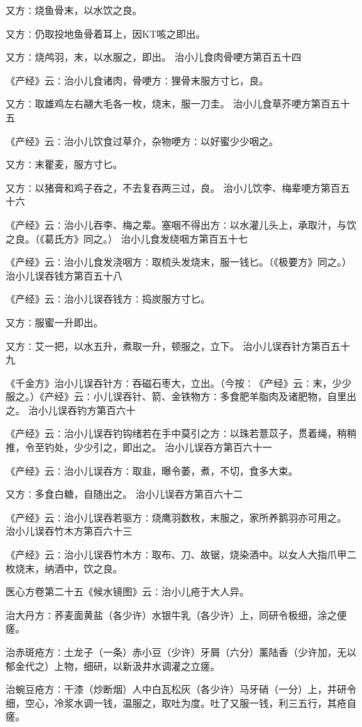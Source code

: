 \documentclass[a4paper,12pt,UTF8,twoside]{ctexbook}
\begin{document}
又方∶烧鱼骨末，以水饮之良。

又方∶仍取投地鱼骨着耳上，因KT咳之即出。

又方∶烧鸬羽，末，以水服之，即出。
治小儿食肉骨哽方第百五十四

《产经》云∶治小儿食诸肉，骨哽方∶狸骨末服方寸匕，良。

又方∶取雄鸡左右翮大毛各一枚，烧末，服一刀圭。
治小儿食草芥哽方第百五十五

《产经》云∶治小儿饮食过草介，杂物哽方∶以好蜜少少咽之。

又方∶末瞿麦，服方寸匕。

又方∶以猪膏和鸡子吞之，不去复吞两三过，良。
治小儿饮李、梅辈哽方第百五十六

《产经》云∶治小儿吞李、梅之辈。塞咽不得出方∶以水灌儿头上，承取汁，与饮之良。（《葛氏方》同之。）
治小儿食发绕咽方第百五十七

《产经》云∶治小儿食发浇咽方∶取梳头发烧末，服一钱匕。（《极要方》同之。）
治小儿误吞钱方第百五十八

《产经》云∶治小儿误吞钱方∶捣炭服方寸匕。

又方∶服蜜一升即出。

又方∶艾一把，以水五升，煮取一升，顿服之，立下。
治小儿误吞针方第百五十九

《千金方》治小儿误吞针方∶吞磁石枣大，立出。（今按∶《产经》云∶末，少少服之。）《产经》云∶小儿误吞针、箭、金铁物方∶多食肥羊脂肉及诸肥物，自里出之。
治小儿误吞钓方第百六十

《产经》云∶治小儿误吞钓钩绪若在手中莫引之方∶以珠若薏苡子，贯着绳，稍稍推，令至钓处，少少引之，即出之。
治小儿误吞方第百六十一

《产经》云∶治小儿误吞方∶取韭，曝令萎，煮，不切，食多大束。

又方∶多食白糖，自随出之。
治小儿误吞方第百六十二

《产经》云∶治小儿误吞若驱方∶烧鹰羽数枚，末服之，家所养鹅羽亦可用之。
治小儿误吞竹木方第百六十三

《产经》云∶治小儿误吞竹木方∶取布、刀、故锯，烧染酒中。以女人大指爪甲二枚烧末，纳酒中，饮之良。

医心方卷第二十五《候水镜图》云∶治小儿疮于大人异。

治大丹方∶荞麦面黄盐（各少许）水银牛乳（各少许）上，同研令极细，涂之便瘥。

治赤斑疮方∶土龙子（一条）赤小豆（少许）牙屑（六分）薰陆香（少许加，无以郁金代之）上物，细研，以新汲井水调灌之立瘥。

治蜿豆疮方∶干漆（炒断烟）人中白瓦松灰（各少许）马牙硝（一分）上，并研令细，空心，冷浆水调一钱，温服之，取吐为度。吐了又服一钱，利三五行，其疮自瘥。
\end{document}
